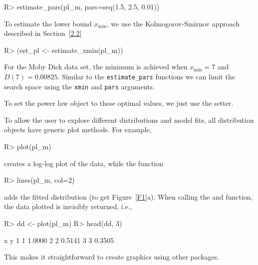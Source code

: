 \documentclass[article]{jss}
\newcommand{\xmin}{x_{\min}}
\begin{document}
\begin{Schunk}
\begin{Sinput}
R> estimate_pars(pl_m, pars=seq(1.5, 2.5, 0.01))
\end{Sinput}
\end{Schunk}
To estimate the lower bound $\xmin$, we use the Kolmogorov-Smirnov approach
described in Section~\ref{2.2}
\begin{Schunk}
\begin{Sinput}
R> (est_pl <- estimate_xmin(pl_m))
\end{Sinput}
\end{Schunk}
For the Moby Dick data set, the minimum is achieved when $\xmin=7$ and $D(7) =
0.00825$. Similar to the \texttt{estimate\_pars}
functions we can limit the search space using the \texttt{xmin} and
\texttt{pars} arguments.

To set the power law object to these optimal values, we just use the
 setter.
\begin{Schunk}
\end{Schunk}
To allow the user to explore different distributions and model fits, all
distribution objects have generic plot methods. For example,
\begin{Schunk}
\begin{Sinput}
R> plot(pl_m)
\end{Sinput}
\end{Schunk}
creates a log-log plot of the data, while the  function
\begin{Schunk}
\begin{Sinput}
R> lines(pl_m, col=2)
\end{Sinput}
\end{Schunk}
adds the fitted distribution (to get Figure~\ref{F1}a). When calling the
 and  function, the data plotted is 
invisibly returned, i.e.,
\begin{Schunk}
\begin{Sinput}
R> dd <- plot(pl_m)
R> head(dd, 3)
\end{Sinput}
\begin{Soutput}
  x      y
1 1 1.0000
2 2 0.5141
3 3 0.3505
\end{Soutput}
\end{Schunk}
This makes it straightforward to create graphics using other
 packages.
\end{document}

